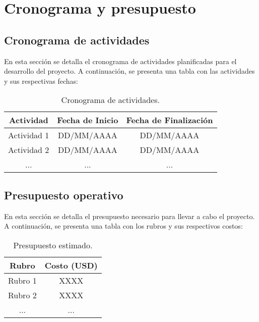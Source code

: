 
\chapter{Cronograma y presupuesto} %

\label{Chapter4}


\section{Cronograma de actividades}

En esta sección se detalla el cronograma de actividades planificadas para el desarrollo del proyecto. A continuación, se presenta una tabla con las actividades y sus respectivas fechas:

\begin{table}[h!]
\centering
\begin{tabular}{|c|c|c|}
\hline
\textbf{Actividad} & \textbf{Fecha de Inicio} & \textbf{Fecha de Finalización} \\ \hline
Actividad 1        & DD/MM/AAAA              & DD/MM/AAAA                    \\ \hline
Actividad 2        & DD/MM/AAAA              & DD/MM/AAAA                    \\ \hline
...                & ...                     & ...                           \\ \hline
\end{tabular}
\caption{Cronograma de actividades.}
\label{tabla:cronograma}
\end{table}


\section{Presupuesto operativo}

En esta sección se detalla el presupuesto necesario para llevar a cabo el proyecto. A continuación, se presenta una tabla con los rubros y sus respectivos costos:

\begin{table}[h!]
\centering
\begin{tabular}{|c|c|}
\hline
\textbf{Rubro} & \textbf{Costo (USD)} \\ \hline
Rubro 1        & XXXX                 \\ \hline
Rubro 2        & XXXX                 \\ \hline
...            & ...                  \\ \hline
\end{tabular}
\caption{Presupuesto estimado.}
\label{tabla:presupuesto}
\end{table}